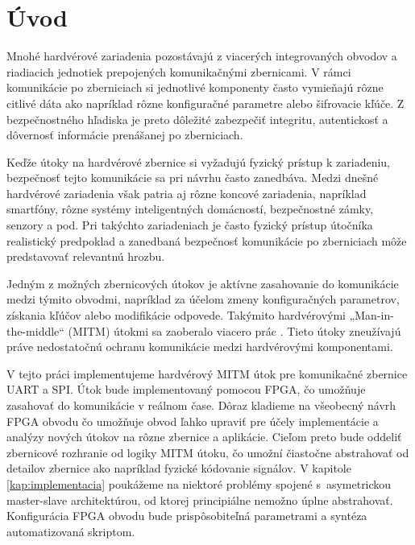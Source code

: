 \chapter*{Úvod} %

Mnohé hardvérové zariadenia pozostávajú z viacerých integrovaných obvodov a riadiacich jednotiek prepojených komunikačnými zbernicami. V rámci komunikácie po zberniciach si jednotlivé komponenty často vymieňajú rôzne citlivé dáta ako napríklad rôzne konfiguračné parametre alebo šifrovacie kľúče.  Z bezpečnostného hľadiska je preto dôležité zabezpečiť integritu, autentickosť a dôvernosť informácie prenášanej po zberniciach.

Keďže útoky na hardvérové zbernice si vyžadujú fyzický prístup k zariadeniu, bezpečnosť tejto komunikácie sa pri návrhu často zanedbáva. Medzi dnešné hardvérové zariadenia však patria aj rôzne koncové zariadenia, napríklad smartfóny, rôzne systémy inteligentných domácností, bezpečnostné zámky, senzory a pod. Pri takýchto zariadeniach je často fyzický prístup útočníka realistický predpoklad a zanedbaná bezpečnosť komunikácie po zberniciach môže predstavovať relevantnú hrozbu.

Jedným z možných zbernicových útokov je aktívne zasahovanie do komunikácie medzi týmito obvodmi, napríklad za účelom zmeny konfiguračných parametrov, získania kľúčov alebo modifikácie odpovede. Takýmito hardvérovými „Man-in-the-middle“ (MITM) útokmi sa zaoberalo viacero prác \cite{mitmCAN, mitmI2C, mitmSmartphone, mitmBitlocker, mitmTouch, mitmTPM}. Tieto útoky zneužívajú práve nedostatočnú ochranu komunikácie medzi hardvérovými komponentami.

V tejto práci implementujeme hardvérový MITM útok pre komunikačné zbernice UART a SPI. Útok bude implementovaný pomocou FPGA, čo umožňuje zasahovať do komunikácie v reálnom čase. Dôraz kladieme na všeobecný návrh FPGA obvodu čo umožňuje obvod ľahko upraviť pre účely implementácie a analýzy nových útokov na rôzne zbernice a aplikácie. Cieľom preto bude oddeliť zbernicové rozhranie od logiky MITM útoku, čo umožní čiastočne abstrahovať od detailov zbernice ako napríklad fyzické kódovanie signálov. V kapitole \ref{kap:implementacia} poukážeme na niektoré problémy spojené s~asymetrickou master-slave architektúrou, od ktorej principiálne nemožno úplne abstrahovať. Konfigurácia FPGA obvodu bude prispôsobiteľná parametrami a syntéza automatizovaná skriptom.

